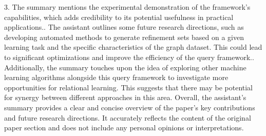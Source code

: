 \documentclass{article}%
\begin{document}
3. The summary mentions the experimental demonstration of the framework's capabilities, which adds credibility to its potential usefulness in practical applications.. The assistant outlines some future research directions, such as developing automated methods to generate refinement sets based on a given learning task and the specific characteristics of the graph dataset. This could lead to significant optimizations and improve the efficiency of the query framework.. Additionally, the summary touches upon the idea of exploring other machine learning algorithms alongside this query framework to investigate more opportunities for relational learning. This suggests that there may be potential for synergy between different approaches in this area.\newline%
\newline%
Overall, the assistant's summary provides a clear and concise overview of the paper's key contributions and future research directions. It accurately reflects the content of the original paper section and does not include any personal opinions or interpretations.

%
\end{document}
